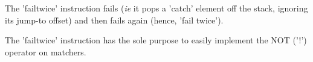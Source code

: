 The 'failtwice' instruction fails (\textit{ie} it pops a 'catch' element
off the stack, ignoring its jump-to offset) and then fails again
(hence, 'fail twice').

The 'failtwice' instruction has the sole purpose to easily implement
the NOT ('!') operator on matchers.
